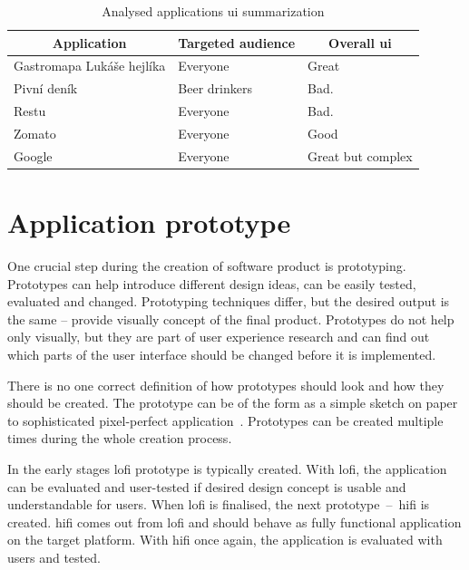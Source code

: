 \begin{table}[htbp]
\centering
\begin{tabular}{|l|l|l|}
\hline
\multicolumn{1}{|c|}{Application} & \multicolumn{1}{c|}{Targeted audience} & \multicolumn{1}{c|}{Overall \gls{ui}} \\ \hline
Gastromapa Lukáše hejlíka         & Everyone                               & Great                           \\ \hline
Pivní deník                       & Beer drinkers                          & Bad.                            \\ \hline
Restu                             & Everyone                               & Bad.                            \\ \hline
Zomato                            & Everyone                               & Good                            \\ \hline
Google                            & Everyone                               & Great but complex              \\ \hline
\end{tabular}
\caption{Analysed applications \gls{ui} summarization}
\label{table:app-analysis}
\end{table}

\section{Application prototype}
One crucial step during the creation of software product is prototyping. Prototypes can help introduce different design ideas, can be easily tested, evaluated and changed. Prototyping techniques differ, but the desired output is the same -- provide visually concept of the final product. Prototypes do not help only visually, but they are part of user experience research and can find out which parts of the user interface should be changed before it is implemented.

There is no one correct definition of how prototypes should look and how they should be created. The prototype can be of the form as a simple sketch on paper to sophisticated pixel-perfect application~\cite{adobe-prototype}. Prototypes can be created multiple times during the whole creation process. 

In the early stages \gls{lofi} prototype is typically created. With \gls{lofi}, the application can be evaluated and user-tested if desired design concept is usable and understandable for users. When \gls{lofi} is finalised, the next prototype~--~\gls{hifi} is created. \gls{hifi} comes out from \gls{lofi} and should behave as fully functional application on the target platform. With \gls{hifi} once again, the application is evaluated with users and tested. 


